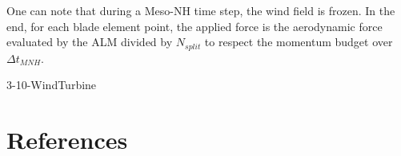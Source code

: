 One can note that during a Meso-NH time step, the wind field is frozen. In the end, for each blade element point, the applied force is the aerodynamic force evaluated by the ALM divided by $N_{split}$ to respect the momentum budget over $\Delta t_{MNH}$.


\begin{btSect}{3-10-WindTurbine}
\section{References}
\btPrintCited
\end{btSect}
